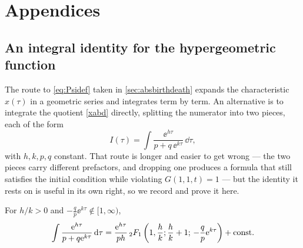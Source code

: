 \appendix
\section*{Appendices}
\renewcommand{\thesubsection}{\Alph{subsection}}
\setcounter{subsection}{0}

\subsection{An integral identity for the hypergeometric function}
\label{app:hyp}

The route to \cref{eq:Psidef} taken in \cref{sec:absbirthdeath} expands the
characteristic $x(\tau)$ in a geometric series and integrates term by term. An
alternative is to integrate the quotient \cref{xabd} directly, splitting the
numerator into two pieces, each of the form
\begin{equation}
\label{eq:Iform}
I(\tau) = \int\frac{\ee^{h\tau}}{p+q\,\ee^{k\tau}}\,\dd\tau ,
\end{equation}
with $h,k,p,q$ constant. That route is longer and easier to get wrong --- the two
pieces carry different prefactors, and dropping one produces a formula that still
satisfies the initial condition while violating $G(1,1,t)=1$ --- but the identity it
rests on is useful in its own right, so we record and prove it here.

\begin{proposition}
\label{prop:hypIden}
For $h/k>0$ and $-\tfrac{q}{p}\ee^{k\tau}\notin[1,\infty)$,
\begin{equation}
\label{hypIden}
\int\frac{{\rm e}^{h\tau}}{p+q{\rm e}^{k\tau}}\,{\rm d}\tau
= \frac{{\rm e}^{h\tau}}{ph}\,{}_2F_1\left(1,\frac{h}{k};\frac{h}{k}+1;\,-\frac{q}{p}{\rm e}^{k\tau}\right) + \text{const}.
\end{equation}
\end{proposition}

